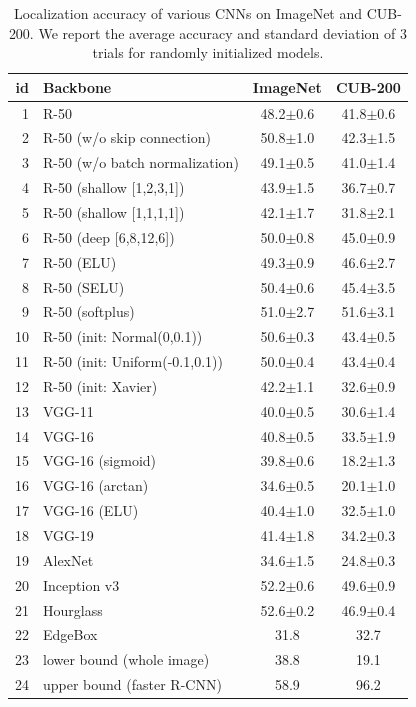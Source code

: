 \documentclass[letterpaper]{article} %
\begin{document}
\begin{table}
	\caption{Localization accuracy of various CNNs on ImageNet and CUB-200. We report the average accuracy and standard deviation of 3 trials for randomly initialized models.}
	\label{tab:loc-results-more}
	\centering
	\setlength{\tabcolsep}{3pt}
	\renewcommand{\arraystretch}{0.95}
	\renewcommand{\multirowsetup}{\centering}
	\begin{tabular}{r|l|c|c}
		\hline
		id &Backbone  &
		ImageNet & CUB-200 \\
		\hline
		1&R-50 &48.2$\pm$0.6	&41.8$\pm$0.6 \\
		2&R-50 (w/o skip connection) & 50.8$\pm$1.0&42.3$\pm$1.5 \\
		3&R-50 (w/o batch normalization) &49.1$\pm$0.5&41.0$\pm$1.4 \\
		4&R-50 (shallow [1,2,3,1])&43.9$\pm$1.5&36.7$\pm$0.7 \\
		5&R-50 (shallow [1,1,1,1])&42.1$\pm$1.7&	31.8$\pm$2.1\\
		6&R-50 (deep [6,8,12,6])&50.0$\pm$0.8&45.0$\pm$0.9\\
		7&R-50 (ELU)&	49.3$\pm$0.9 & 46.6$\pm$2.7\\
		8&R-50 (SELU)& 50.4$\pm$0.6 & 45.4$\pm$3.5\\
		9&R-50 (softplus)& 51.0$\pm$2.7&	51.6$\pm$3.1\\
		10&R-50 (init: Normal(0,0.1)) & 50.6$\pm$0.3 & 43.4$\pm$0.5\\
		11&R-50 (init: Uniform(-0.1,0.1)) & 50.0$\pm$0.4 & 43.4$\pm$0.4 \\
		12&R-50 (init: Xavier) & 42.2$\pm$1.1 & 32.6$\pm$0.9 \\
		\hline
		13&VGG-11 &	40.0$\pm$0.5&	30.6$\pm$1.4 \\
		14&VGG-16 &	40.8$\pm$0.5&	33.5$\pm$1.9\\
		15&VGG-16 (sigmoid)&	39.8$\pm$0.6&	18.2$\pm$1.3 \\
		16&VGG-16 (arctan)	&34.6$\pm$0.5&20.1$\pm$1.0\\
		17&VGG-16 (ELU)	&40.4$\pm$1.0&32.5$\pm$1.0\\
		18&VGG-19 &	41.4$\pm$1.8&	34.2$\pm$0.3\\
		\hline
		19&AlexNet	&34.6$\pm$1.5&	24.8$\pm$0.3 \\
		\hline
		20&Inception v3&	52.2$\pm$0.6&49.6$\pm$0.9\\
		\hline
		21&Hourglass& 52.6$\pm$0.2&46.9$\pm$0.4\\
		\hline
		22&EdgeBox&	31.8&	32.7\\
		23&lower bound (whole image)&	38.8&	19.1\\
		24&upper bound (faster R-CNN)&	58.9&	96.2\\
		\hline
	\end{tabular}
\end{table}
\end{document}
